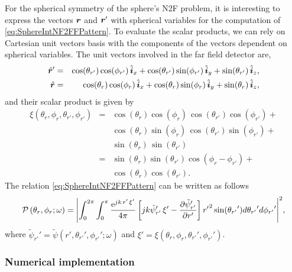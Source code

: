 \par For the spherical symmetry of the sphere's N2F problem, it is interesting to express the vectors $\mbfit{r}$ and $\mbfit{r'}$ with spherical variables for the computation of \eqref{eq:SphereIntNF2FFPattern}. To evaluate the scalar products, we can rely on Cartesian unit vectors basis with the components of the vectors dependent on spherical variables. The unit vectors involved in the far field detector are,
\begin{eqnarray}
\hat{\mbfit{r}}'  &=  &\cos(\theta_{r'}) \cos(\phi_{r'}) \, \hat{\mbfit{i}}_x + \cos(\theta_{r'}) \sin(\phi_{r'}) \, \hat{\mbfit{i}}_y + \sin(\theta_{r'}) \, \hat{\mbfit{i}}_z, \nonumber \\
\hat{\mbfit{r}}   &=   &\cos(\theta_{r}) \cos(\phi_{r}) \, \hat{\mbfit{i}}_x + \cos(\theta_{r}) \sin(\phi_{r}) \, \hat{\mbfit{i}}_y + \sin(\theta_{r}) \, \hat{\mbfit{i}}_z,
\end{eqnarray} and their scalar product is given by
\begin{eqnarray}
\xi(\theta_{r}, \phi_{r}, \theta_{r'}, \phi_{r'}) &= &\cos(\theta_{r}) \cos(\phi_{r}) \, \cos(\theta_{r'}) \cos(\phi_{r'}) + \nonumber \\
& & \cos(\theta_{r}) \sin(\phi_{r}) \, \cos(\theta_{r'}) \sin(\phi_{r'}) + \nonumber \\
& & \sin(\theta_{r}) \, \sin(\theta_{r'}) \nonumber \\
&= & \sin(\theta_{r}) \sin(\theta_{r'}) \cos(\phi_{r} - \phi_{r'}) + \nonumber \\
& & \cos(\theta_{r}) \cos(\theta_{r'}).
\end{eqnarray} The relation \eqref{eq:SphereIntNF2FFPattern} can be written as follows
\begin{eqnarray}
\label{eq:SphereIntNF2FFPatternSphCoord}
\mathcal{P} \left ( \theta_{r}, \phi_{r} ; \omega \right ) = { \left |\int_0^{2\pi}  \int_0^{\pi} \frac{\mathrm{e}^{jk \, r' \, {\xi}' }}{4\pi}  \left [ jk {\tilde{\psi}_{r'}}' \, {\xi}'   -  \frac{\partial{{\tilde{\psi}_{r'}}'}}{\partial{r'}} \right ] {r'}^2 \sin({\theta_{r'}}') d{\theta_{r'}}' d{\phi_{r'}}'  \right | }^2,
\end{eqnarray} where ${\tilde{\psi}_{r'}}' = \tilde{\psi}(r', {\theta_{r'}}', {\phi_{r'}}' ; \omega)$ and ${\xi}' = \xi(\theta_{r}, \phi_{r}, {\theta_{r'}}', {\phi_{r'}}')$.

\subsubsection{Numerical implementation} \label{sec:NumImp}

